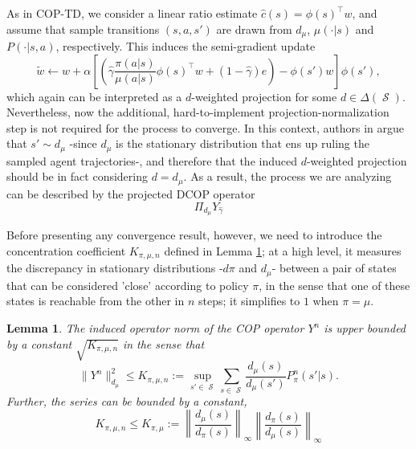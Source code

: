 \documentclass[12pt,a4paper,openright,twoside]{article}
\DeclareMathOperator*{\Sspace}{\mathcal{S}}
\numberwithin{equation}{section}
\newtheorem{lemma}[theorem]{Lemma}
\theoremstyle{definition}
\theoremstyle{remark}
\theoremstyle{plain}
\begin{document}
As in COP-TD, we consider a linear ratio estimate $\hat{c}(s) = \phi(s)^\top w$, and assume that sample transitions $(s,a,s')$ are drawn from $d_\mu$, $\mu(\cdot|s)$ and $P(\cdot|s,a)$, respectively. This induces the semi-gradient update
\begin{equation} \label{updateLinearDCOPTD}
	\tilde{w} \leftarrow w + \alpha \left[ \left( \hat{\gamma} \frac{\pi(a|s)}{\mu(a|s)} \phi(s)^\top w + (1 - \hat{\gamma})e \right) - \phi(s') w \right] \phi(s'),
\end{equation}
which again can be interpreted as a $d$-weighted projection for some $d\in\Delta(\Sspace)$. Nevertheless, now the additional, hard-to-implement projection-normalization step is not required for the process to converge. In this context, authors in \cite{DCOPTD} argue that $s' \sim d_\mu$ -since $d_\mu$ is the stationary distribution that ens up ruling the sampled agent trajectories-, and therefore that the induced $d$-weighted projection should be in fact considering $d=d_\mu$. As a result, the process we are analyzing can be described by the projected DCOP operator 
\begin{equation*}
	\Pi_{d_\mu} Y_{\hat{\gamma}}
\end{equation*}

Before presenting any convergence result, however, we need to introduce the concentration coefficient $K_{\pi,\mu,n}$ defined in Lemma \ref{coefficientK}; at a high level, it measures the discrepancy in stationary distributions -$d\pi$ and $d_\mu$- between a pair of states that can be considered 'close' according to policy $\pi$, in the sense that one of these states is reachable from the other in $n$ steps; it simplifies to $1$ when $\pi=\mu$.
\begin{lemma} \label{coefficientK}
	The induced operator norm of the COP operator $Y^n$ is upper bounded by a constant $\sqrt{K_{\pi,\mu,n}}$ in the sense that
	\begin{equation*}
		\| Y^n \|^2_{d_\mu} \leq K_{\pi,\mu,n} := \sup_{s'\in \Sspace} \sum_{s\in \Sspace} \frac{d_\mu(s)}{d_\mu(s')} P_{\pi}^n(s' | s).
	\end{equation*}
	Further, the series can be bounded by a constant,
	\begin{equation*}
		K_{\pi,\mu,n} \leq K_{\pi,\mu} := \left\| \frac{d_\mu(s)}{d_\pi(s)} \right\|_\infty \left\| \frac{d_\pi(s)}{d_\mu(s)} \right\|_\infty  
	\end{equation*}
\end{lemma}
\end{document}
